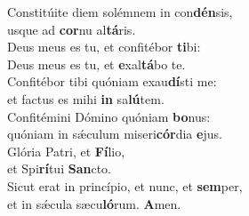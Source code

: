 \evenverse Constitúite diem solémnem in con\textbf{dén}sis,~\*\\
\evenverse usque ad \textbf{cor}nu al\textbf{tá}ris.\\
\oddverse Deus meus es tu, et confitébor \textbf{ti}bi:~\*\\
\oddverse Deus meus es tu, et \textbf{e}xal\textbf{tá}bo te.\\
\evenverse Confitébor tibi quóniam exau\textbf{dí}sti me:~\*\\
\evenverse et factus es mihi \textbf{in} sa\textbf{lú}tem.\\
\oddverse Confitémini Dómino quóniam \textbf{bo}nus:~\*\\
\oddverse quóniam in sǽculum miseri\textbf{cór}dia \textbf{e}jus.\\
\evenverse Glória Patri, et \textbf{Fí}lio,~\*\\
\evenverse et Spi\textbf{rí}tui \textbf{San}cto.\\
\oddverse Sicut erat in princípio, et nunc, et \textbf{sem}per,~\*\\
\oddverse et in sǽcula sæcu\textbf{ló}rum. \textbf{A}men.\\
